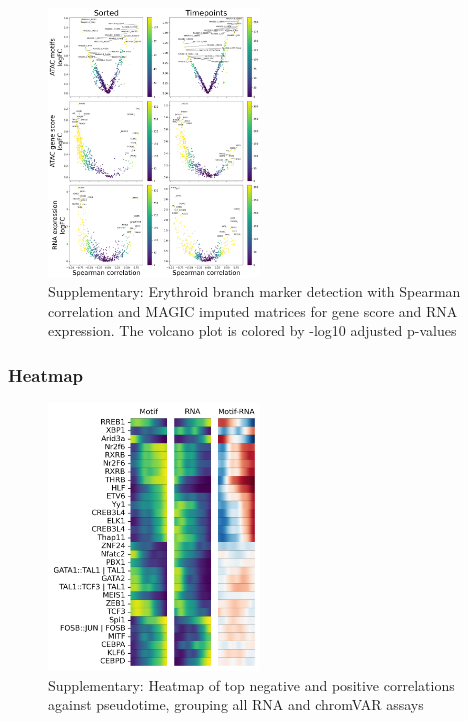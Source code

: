 \documentclass[a4paper]{article}
\begin{document}
\begin{figure}[!htb]
  \centering
  \includegraphics[width=0.5\textwidth]{../figures/hematopoiesis/Monocyte_40_15_smooth_magic_single_branch_volcanos_motifs.png}
  \caption{Supplementary: Erythroid branch marker detection with Spearman correlation and MAGIC imputed matrices for gene score and RNA expression. The volcano plot is colored by -log10 adjusted p-values}
\end{figure}

\FloatBarrier
\subsubsection{Heatmap}

\begin{figure}[!htb]
  \centering
  \includegraphics[width=0.5\textwidth]{../figures/hematopoiesis/Monocyte_40_15_single_smooth_none_heatmap_grouped_assays.png}
  \caption{Supplementary: Heatmap of top negative and positive correlations against pseudotime, grouping all RNA and chromVAR assays}
\end{figure}
\end{document}
